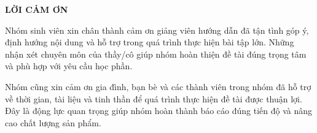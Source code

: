 \documentclass[../BTL_PTIT.tex]{subfiles}
\begin{document}
\begin{center}
    \Large{\textbf{LỜI CẢM ƠN}}\\
\end{center}
\vspace{1cm}
\hspace*{15pt}Nhóm sinh viên xin chân thành cảm ơn giảng viên hướng dẫn đã tận tình góp ý, định hướng nội dung và hỗ trợ trong quá trình thực hiện bài tập lớn. Những nhận xét chuyên môn của thầy/cô giúp nhóm hoàn thiện đề tài đúng trọng tâm và phù hợp với yêu cầu học phần.

Nhóm cũng xin cảm ơn gia đình, bạn bè và các thành viên trong nhóm đã hỗ trợ về thời gian, tài liệu và tinh thần để quá trình thực hiện đề tài được thuận lợi. Đây là động lực quan trọng giúp nhóm hoàn thành báo cáo đúng tiến độ và nâng cao chất lượng sản phẩm.
\end{document}
